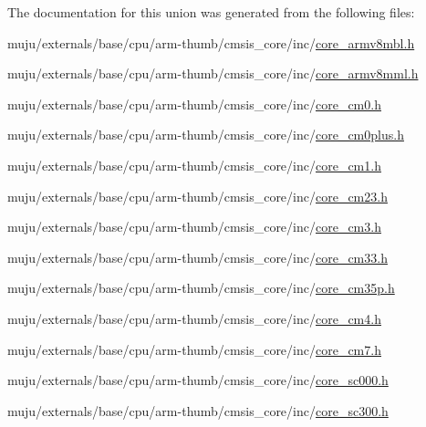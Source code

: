 The documentation for this union was generated from the following files\+:\begin{DoxyCompactItemize}
\item 
muju/externals/base/cpu/arm-\/thumb/cmsis\+\_\+core/inc/\hyperlink{core__armv8mbl_8h}{core\+\_\+armv8mbl.\+h}\item 
muju/externals/base/cpu/arm-\/thumb/cmsis\+\_\+core/inc/\hyperlink{core__armv8mml_8h}{core\+\_\+armv8mml.\+h}\item 
muju/externals/base/cpu/arm-\/thumb/cmsis\+\_\+core/inc/\hyperlink{core__cm0_8h}{core\+\_\+cm0.\+h}\item 
muju/externals/base/cpu/arm-\/thumb/cmsis\+\_\+core/inc/\hyperlink{core__cm0plus_8h}{core\+\_\+cm0plus.\+h}\item 
muju/externals/base/cpu/arm-\/thumb/cmsis\+\_\+core/inc/\hyperlink{core__cm1_8h}{core\+\_\+cm1.\+h}\item 
muju/externals/base/cpu/arm-\/thumb/cmsis\+\_\+core/inc/\hyperlink{core__cm23_8h}{core\+\_\+cm23.\+h}\item 
muju/externals/base/cpu/arm-\/thumb/cmsis\+\_\+core/inc/\hyperlink{core__cm3_8h}{core\+\_\+cm3.\+h}\item 
muju/externals/base/cpu/arm-\/thumb/cmsis\+\_\+core/inc/\hyperlink{core__cm33_8h}{core\+\_\+cm33.\+h}\item 
muju/externals/base/cpu/arm-\/thumb/cmsis\+\_\+core/inc/\hyperlink{core__cm35p_8h}{core\+\_\+cm35p.\+h}\item 
muju/externals/base/cpu/arm-\/thumb/cmsis\+\_\+core/inc/\hyperlink{core__cm4_8h}{core\+\_\+cm4.\+h}\item 
muju/externals/base/cpu/arm-\/thumb/cmsis\+\_\+core/inc/\hyperlink{core__cm7_8h}{core\+\_\+cm7.\+h}\item 
muju/externals/base/cpu/arm-\/thumb/cmsis\+\_\+core/inc/\hyperlink{core__sc000_8h}{core\+\_\+sc000.\+h}\item 
muju/externals/base/cpu/arm-\/thumb/cmsis\+\_\+core/inc/\hyperlink{core__sc300_8h}{core\+\_\+sc300.\+h}\end{DoxyCompactItemize}
